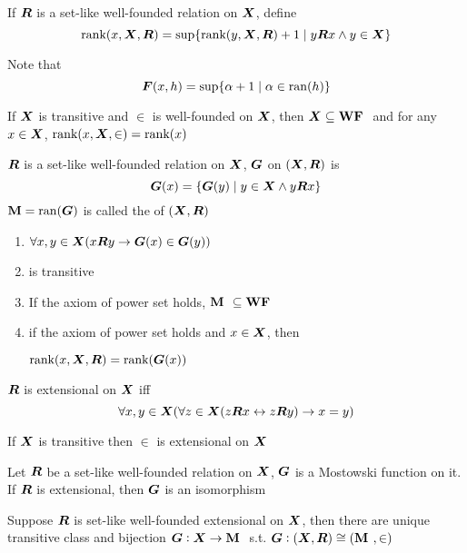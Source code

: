 \documentclass[11pt]{article}
\begin{document}
\begin{definition}[]
If \(\boldsymbol{R}\) is a set-like well-founded relation on \(\boldsymbol{X}\), define 
\begin{equation*}
\text{rank}(x,\boldsymbol{X},\boldsymbol{R})=\sup\{\text{rank}(y,\boldsymbol{X},\boldsymbol{R})+1\mid y\boldsymbol{R} x\wedge y\in\boldsymbol{X}\}
\end{equation*}
\end{definition}

Note that
\begin{equation*}
\boldsymbol{F}(x,h)=\sup\{\alpha+1\mid\alpha\in\mathrm{ran}{(h)}\}
\end{equation*}

\begin{lemma}[$\zfmm$]
If \(\boldsymbol{X}\) is transitive and \(\in\) is well-founded on \(\boldsymbol{X}\), then
\(\boldsymbol{X}\subseteq\textbf{WF }\) and for any \(x\in\boldsymbol{X}\), \(\text{rank}(x,\boldsymbol{X},\in)=\text{rank}(x)\)
\end{lemma}

\begin{definition}[]
\(\boldsymbol{R}\) is a set-like well-founded relation on \(\boldsymbol{X}\), 
\(\boldsymbol{G}\) on \((\boldsymbol{X},\boldsymbol{R})\) is 
\begin{equation*}
\boldsymbol{G}(x)=\{\boldsymbol{G}(y)\mid y\in\boldsymbol{X}\wedge y\boldsymbol{R} x\}
\end{equation*}
\(\textbf{M}=\mathrm{ran}{(\boldsymbol{G})}\) is called the  of \((\boldsymbol{X},\boldsymbol{R})\)
\end{definition}

\begin{lemma}[]
\begin{enumerate}
\item \(\forall x,y\in\boldsymbol{X}(x\boldsymbol{R} y\to\boldsymbol{G}(x)\in\boldsymbol{G}(y))\)
\item \cm is transitive
\item If the axiom of power set holds, \(\textbf{M }\subseteq\textbf{WF }\)
\item if the axiom of power set holds and \(x\in\boldsymbol{X}\), then\par
\(\text{rank}(x,\boldsymbol{X},\boldsymbol{R})=\text{rank}(\boldsymbol{G}(x))\)
\end{enumerate}
\end{lemma}

\begin{definition}[]
\(\boldsymbol{R}\) is extensional on \(\boldsymbol{X}\) iff
\begin{equation*}
\forall x,y\in\boldsymbol{X}(\forall z\in\boldsymbol{X}(z\boldsymbol{R} x\leftrightarrow z\boldsymbol{R} y)\to x=y)
\end{equation*}
\end{definition}

\begin{lemma}[]
If \(\boldsymbol{X}\) is transitive then \(\in\) is extensional on \(\boldsymbol{X}\)
\end{lemma}


\begin{lemma}[]
Let \(\boldsymbol{R}\) be a set-like well-founded relation on \(\boldsymbol{X}\), \(\boldsymbol{G}\) is a Mostowski
function on it. If \(\boldsymbol{R}\) is extensional, then \(\boldsymbol{G}\) is an isomorphism
\end{lemma}

\begin{theorem}
Suppose \(\boldsymbol{R}\) is set-like well-founded extensional on \(\boldsymbol{X}\), then there are
unique transitive class \cm and bijection \(\boldsymbol{G}:\boldsymbol{X}\to\textbf{M }\) s.t. 
\(\boldsymbol{G}:(\boldsymbol{X},\boldsymbol{R})\cong(\textbf{M },\in)\)
\end{theorem}
\end{document}
